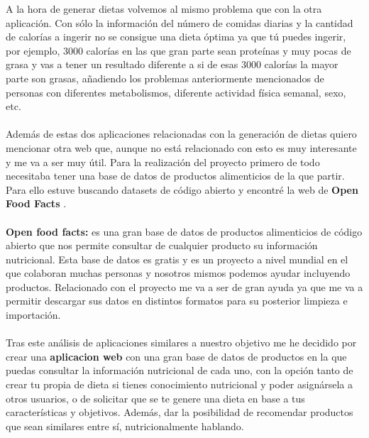 A la hora de generar dietas volvemos al mismo problema que con la otra aplicación. Con sólo la información del número de comidas diarias y la cantidad de calorías a ingerir
no se consigue una dieta óptima ya que tú puedes ingerir, por ejemplo, 3000 calorías en las que gran parte sean proteínas y muy pocas de grasa y vas a tener un resultado diferente a si de 
esas 3000 calorías la mayor parte son grasas, añadiendo los problemas anteriormente mencionados de personas con diferentes metabolismos, diferente actividad física semanal, sexo, etc.
\\\\ 
Además de estas dos aplicaciones relacionadas con la generación de dietas quiero mencionar otra web que, aunque no está relacionado con esto es muy interesante y me va a ser muy útil.
Para la realización del proyecto primero de todo necesitaba tener una base de datos de productos alimenticios de la que partir. Para ello estuve buscando datasets de código abierto y encontré la web de \textbf{Open Food Facts} \cite{OpenFoodFacts}.
\\\\
\textbf{Open food facts:} es una gran base de datos de productos alimenticios de código abierto que nos permite consultar de cualquier producto su información nutricional.
Esta base de datos es gratis y es un proyecto a nivel mundial en el que colaboran muchas personas y nosotros mismos podemos ayudar incluyendo productos.
Relacionado con el proyecto me va a ser de gran ayuda ya que me va a permitir descargar sus datos en distintos formatos para su posterior limpieza e importación.
\\\\
Tras este análisis de aplicaciones similares a nuestro objetivo me he decidido por crear una \textbf{aplicacion web} con una gran base de datos de productos en la que puedas consultar
la información nutricional de cada uno, con la opción tanto de crear tu propia de dieta si tienes conocimiento nutricional y poder asignársela a otros usuarios, o de solicitar que 
se te genere una dieta en base a tus características y objetivos. Además, dar la posibilidad de recomendar productos que sean similares entre sí, nutricionalmente hablando.
